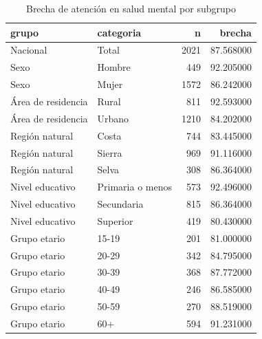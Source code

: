 \begin{table}[htbp]
\caption{Brecha de atención en salud mental por subgrupo}
\label{tab:tabla_11_brecha_atencion}
\begin{tabular}{llrr}
\toprule
grupo & categoria & n & brecha \\
\midrule
Nacional & Total & 2021 & 87.568000 \\
Sexo & Hombre & 449 & 92.205000 \\
Sexo & Mujer & 1572 & 86.242000 \\
Área de residencia & Rural & 811 & 92.593000 \\
Área de residencia & Urbano & 1210 & 84.202000 \\
Región natural & Costa & 744 & 83.445000 \\
Región natural & Sierra & 969 & 91.116000 \\
Región natural & Selva & 308 & 86.364000 \\
Nivel educativo & Primaria o menos & 573 & 92.496000 \\
Nivel educativo & Secundaria & 815 & 86.364000 \\
Nivel educativo & Superior & 419 & 80.430000 \\
Grupo etario & 15-19 & 201 & 81.000000 \\
Grupo etario & 20-29 & 342 & 84.795000 \\
Grupo etario & 30-39 & 368 & 87.772000 \\
Grupo etario & 40-49 & 246 & 86.585000 \\
Grupo etario & 50-59 & 270 & 88.519000 \\
Grupo etario & 60+ & 594 & 91.231000 \\
\bottomrule
\end{tabular}
\end{table}
